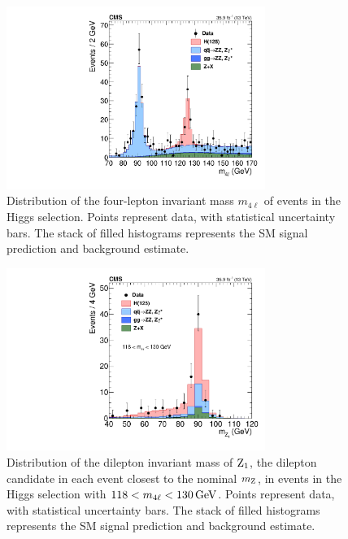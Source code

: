 \begin{figure}[htbp]
  \begin{center}
    \includegraphics[width=0.75\textwidth]{results/hzzMass.pdf}
    \caption[Four-lepton mass spectrum around the Higgs resonance]{
        Distribution of the four-lepton invariant mass $m_{4\ell}$ of events in the Higgs selection.
        Points represent data, with statistical uncertainty bars.
        The stack of filled histograms represents the SM signal prediction and background estimate.
      }\label{fig:mass_hzz}
  \end{center}
\end{figure}

\begin{figure}[htbp]
  \begin{center}
    \includegraphics[width=0.75\textwidth]{results/hzzz1Mass.pdf}
    \caption[Mass of $\PZ_1$ candidates in events near the Higgs resonance]{
        Distribution of the dilepton invariant mass of $\PZ_1$, the dilepton candidate in each event closest to the nominal $m_\mathrm{Z}$, in events in the Higgs selection with $118 < m_{4\ell} < 130\,\mathrm{Ge\hspace{-.08em}V}$.
        Points represent data, with statistical uncertainty bars.
        The stack of filled histograms represents the SM signal prediction and background estimate.
      }\label{fig:z1Mass_hzz}
  \end{center}
\end{figure}

